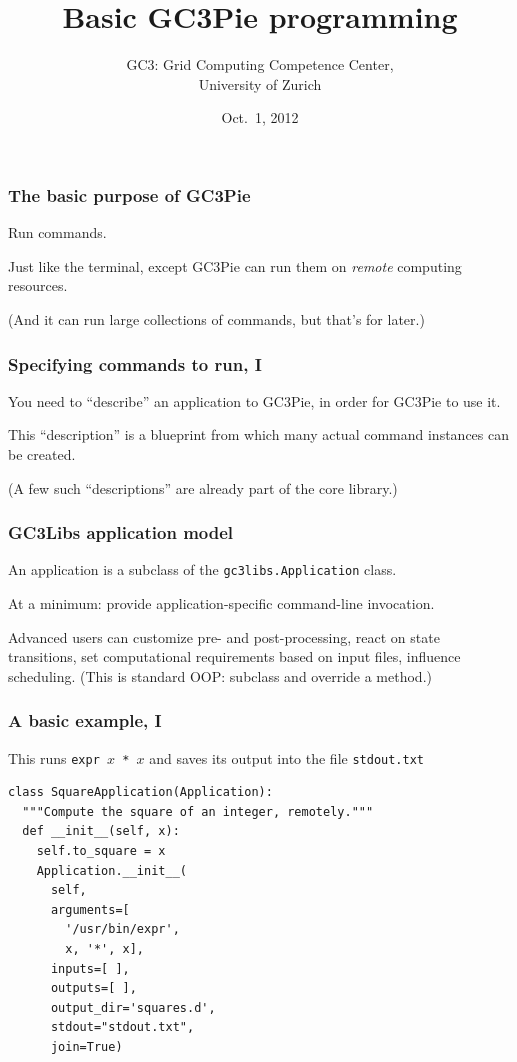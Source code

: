 \documentclass[english,serif,mathserif,xcolor=pdftex,dvipsnames,table]{beamer}
\title[GC3Pie basics]{%
  Basic GC3Pie programming
}
\author[Riccardo Murri]{%
  GC3: Grid Computing Competence Center, \\
  University of Zurich
}
\date{Oct.~1, 2012}
\begin{document}
\maketitle

\begin{frame}
  \frametitle{The basic purpose of GC3Pie}

  Run commands.

  \+ 
  Just like the terminal, except GC3Pie can run them on
  \emph{remote} computing resources.

  \+
  (And it can run large collections of commands, but that's for later.)
  
\end{frame}


\begin{frame}
  \frametitle{Specifying commands to run, I}
  
  You need to ``describe'' an application to GC3Pie, in order for
  GC3Pie to use it.

  \+ 
  This ``description'' is a blueprint from which many actual
  command instances can be created.

  \+
  (A few such ``descriptions'' are already part of the core library.)
\end{frame}


\begin{frame}
\frametitle{GC3Libs application model}

  An application is a subclass of the \texttt{gc3libs.Application} class.

  \+
  At a minimum: provide application-specific command-line invocation.

  \+
  Advanced users can customize pre- and post-processing, react on
  state transitions, set computational requirements based on input
  files, influence scheduling.  (This is standard OOP: subclass and
  override a method.)
\end{frame}

\begin{frame}[fragile]
\frametitle{A basic example, I}

  This runs \texttt{expr $x$ * $x$} and saves its output into the file \texttt{stdout.txt}

  \+
\begin{lstlisting}
class SquareApplication(Application):
  """Compute the square of an integer, remotely."""
  def __init__(self, x):
    self.to_square = x
    Application.__init__(
      self,
      arguments=[
        '/usr/bin/expr', 
        x, '*', x],
      inputs=[ ],
      outputs=[ ],
      output_dir='squares.d',
      stdout="stdout.txt",
      join=True)
\end{lstlisting}
\end{frame}
\end{document}

